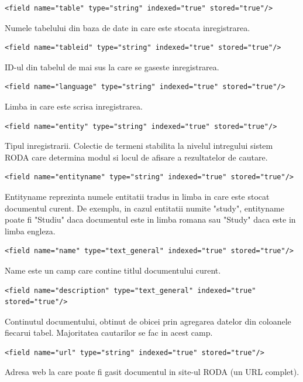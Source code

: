 \documentclass[a4paper, 10pt]{article}
\begin{document}
{\begin{lstlisting}[breaklines=true]
<field name="table" type="string" indexed="true" stored="true"/>
\end{lstlisting}
Numele tabelului din baza de date in care este stocata inregistrarea. 

\begin{lstlisting}[breaklines=true]
<field name="tableid" type="string" indexed="true" stored="true"/>
\end{lstlisting}
ID-ul din tabelul de mai sus la care se gaseste inregistrarea. 

\begin{lstlisting}[breaklines=true]
<field name="language" type="string" indexed="true" stored="true"/>
\end{lstlisting}
Limba in care este scrisa inregistrarea. 

\begin{lstlisting}[breaklines=true]
<field name="entity" type="string" indexed="true" stored="true"/>
\end{lstlisting}
Tipul inregistrarii. Colectie de termeni stabilita la nivelul intregului sistem RODA care determina modul si locul de afisare a rezultatelor de cautare. 

\begin{lstlisting}[breaklines=true]
<field name="entityname" type="string" indexed="true" stored="true"/>
\end{lstlisting}
Entityname reprezinta numele entitatii tradus in limba in care este stocat documentul curent. 
De exemplu, in cazul entitatii numite "study", 
entityname poate fi "Studiu" daca documentul este in limba romana 
sau "Study" daca este in limba engleza. 

\begin{lstlisting}[breaklines=true]
<field name="name" type="text_general" indexed="true" stored="true"/>
\end{lstlisting}
Name este un camp care contine titlul documentului curent.

\begin{lstlisting}[breaklines=true]
<field name="description" type="text_general" indexed="true" stored="true"/>
\end{lstlisting}
Continutul documentului, obtinut de obicei prin agregarea datelor din coloanele fiecarui tabel. 
Majoritatea cautarilor se fac in acest camp. 

\begin{lstlisting}[breaklines=true]
<field name="url" type="string" indexed="true" stored="true"/>
\end{lstlisting}
Adresa web la care poate fi gasit documentul in site-ul RODA (un URL complet).

}
\end{document}
